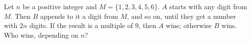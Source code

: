 Let $n$ be a positive integer and $M = \{1, 2, 3, 4, 5, 6\}$. $A$ starts with any digit from $M$. Then $B$ appends to it a digit from $M$, and so on, until they get a number with $2n$ digits. If the result is a multiple of $9$, then $A$ wins; otherwise $B$ wins. Who wins, depending on $n$?
